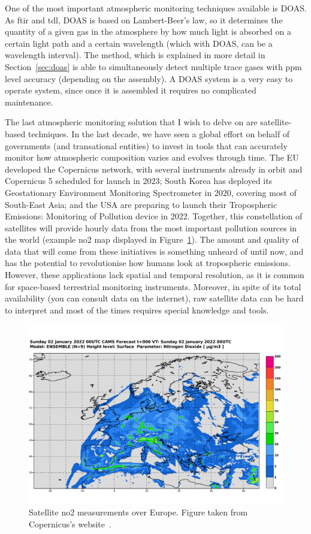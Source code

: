 One of the most important atmospheric monitoring techniques available is
\gls{DOAS}. As \gls{ftir} and \gls{tdl}, \gls{DOAS} is based on
Lambert-Beer's law, so it determines the quantity of a given gas in the
atmosphere by how much light is absorbed on a certain light path and a
certain wavelength (which with \gls{DOAS}, can be a wavelength
interval). The method, which is explained in more detail in
Section~\ref{sec:doas} is able to simultaneously detect multiple trace
gases with ppm level accuracy (depending on the assembly). A \gls{DOAS}
system is a very easy to operate system, since once it is assembled it
requires no complicated maintenance.

The last atmospheric monitoring solution that I wish to delve on are
satellite-based techniques. In the last decade, we have seen a global
effort on behalf of governments (and transational entities) to invest in
tools that can accurately monitor how atmospheric composition varies and
evolves through time. The EU developed the Copernicus network, with
several instruments already in orbit and Copernicus 5 scheduled for
launch in 2023; South Korea has deployed its Geostationary Environment
Monitoring Spectrometer in 2020, covering most of South-East Asia; and
the USA are preparing to launch their Tropospheric Emissions: Monitoring
of Pollution device in 2022. Together, this constellation of satellites
will provide hourly data from the most important pollution sources in
the world (example \gls{no2} map displayed in
Figure~\ref{fig:ap_monitoring_copernicus}). The amount and quality of
data that will come from these initiatives is something unheard of until
now, and has the potential to revolutionise how humans look at
tropospheric emissions. However, these applications lack spatial and
temporal resolution, as it is common for space-based terrestrial
monitoring instruments. Moreover, in spite of its total availability
(you can consult data on the internet), raw satellite data can be hard
to interpret and most of the times requires special knowledge and tools.

\begin{figure}[htpb]
    \centering
    \includegraphics[width=.8\textwidth]{img/pdf/ENSEMBLE_no2_2022010200_SFC_000.pdf}
    \caption{Satellite \gls{no2} measurements over Europe. Figure taken
    from Copernicus's website~\cite{copernicusweb2021}.}%
    \label{fig:ap_monitoring_copernicus}
\end{figure}

